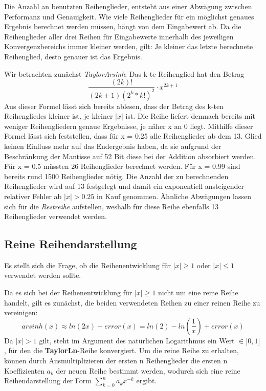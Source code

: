 \documentclass[course=erap] {aspdoc}
\begin{document}
    Die Anzahl an benutzten Reihenglieder, entsteht aus einer Abwägung zwischen Performanz und Genauigkeit.
    Wie viele Reihenglieder für ein möglichst genaues Ergebnis berechnet werden müssen, hängt von dem Eingabewert ab.
    Da die Reihenglieder aller drei Reihen für Eingabewerte innerhalb des jeweiligen Konvergenzbereichs immer kleiner werden, gilt:
    Je kleiner das letzte berechnete Reihenglied, desto genauer ist das Ergebnis.

    Wir betrachten zunächst \textit{TaylorArsinh}:
    Das k-te Reihenglied hat den Betrag
    \[
        \frac{(2k)!}{(2k + 1)(2^k*k!)^2}\cdot x^{2k+1}
    \]
    Aus dieser Formel lässt sich bereits ablesen, dass der Betrag des k-ten Reihengliedes kleiner ist, je kleiner $|x|$ ist.
    Die Reihe liefert demnach bereits mit weniger Reihengliedern genaue Ergebnisse, je näher x an 0 liegt.
    Mithilfe dieser Formel lässt sich feststellen, dass für x = 0.25 alle Reihenglieder ab dem 13. Glied keinen Einfluss mehr auf das Endergebnis haben, da sie aufgrund der Beschränkung der Mantisse auf 52 Bit diese bei der Addition absorbiert werden.
    Für x = 0.5 müssten 26 Reihenglieder berechnet werden.
    Für x = 0.99 sind bereits rund 1500 Reihenglieder nötig.
    Die Anzahl der zu berechnenden Reihenglieder wird auf 13 festgelegt und damit ein exponentiell ansteigender relativer Fehler ab $|x|>0.25$ in Kauf genommen.
    Ähnliche Abwägungen lassen sich für die \textit{Restreihe} aufstellen, weshalb für diese Reihe ebenfalls 13 Reihenglieder verwendet werden.

    \subsection{Reine Reihendarstellung}\label{subsec:reine-reihendarstellung}

    Es stellt sich die Frage, ob die Reihenentwicklung für $|x|\geq1$ oder $|x|\leq1$ verwendet werden sollte.

    Da es sich bei der Reihenentwicklung für $|x|\geq1$ nicht um eine reine Reihe handelt, gilt es zunächst, die beiden verwendeten Reihen zu einer reinen Reihe zu vereinigen:
    \[
        arsinh(x)\approx ln(2x) + error(x) = ln(2) - ln(\frac{1}{x}) + error(x)
    \]
    Da $|x|>1$ gilt, steht im Argument des natürlichen Logarithmus ein Wert $\in ]0, 1]$, für den die \textbf{TaylorLn}-Reihe konvergiert.
    Um die reine Reihe zu erhalten, können durch Ausmultiplizieren der ersten n Reihenglieder die ersten n Koeffizienten $a_k$ der neuen Reihe bestimmt werden, wodurch sich eine reine Reihendarstellung der Form $\sum_{k=0}^{n} a_k x^{-k}$ ergibt.
\end{document}
